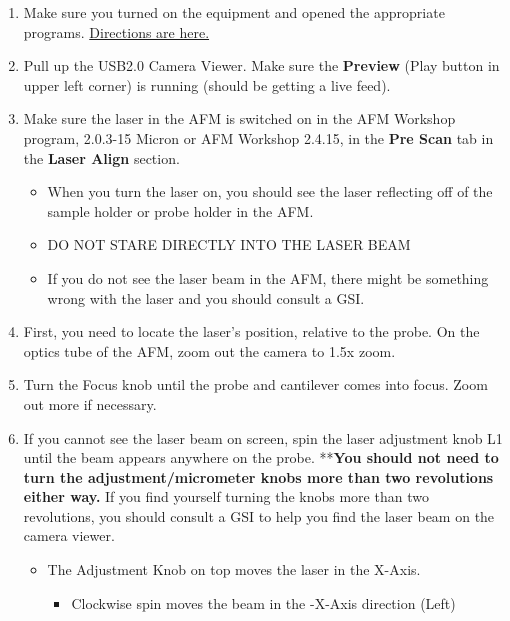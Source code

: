 \documentclass{../lab}
\begin{document}
\begin{enumerate}
    \item Make sure you turned on the equipment and opened the appropriate programs. \hyperref[subsec:TurnOnInstrumentsAndOpenPrograms]{Directions are here.}

    \item Pull up the USB2.0 Camera Viewer. Make sure the \textbf{Preview} (Play button in upper left corner) is running (should be getting a live feed).

    \item Make sure the laser in the AFM is switched on in the AFM Workshop program, 2.0.3-15 Micron or AFM Workshop 2.4.15, in the \textbf{Pre Scan} tab in the \textbf{Laser Align} section.
    \begin{itemize}
        \item When you turn the laser on, you should see the laser reflecting off of the sample holder or probe holder in the AFM.

        \item DO NOT STARE DIRECTLY INTO THE LASER BEAM

        \item If you do not see the laser beam in the AFM, there might be something wrong with the laser and you should consult a GSI.
    \end{itemize}

    \item First, you need to locate the laser's position, relative to the probe.  On the optics tube of the AFM, zoom out the camera to 1.5x zoom.

    \item Turn the Focus knob until the probe and cantilever comes into focus.  Zoom out more if necessary.

    \item If you cannot see the laser beam on screen, spin the laser adjustment knob L1 \textbf{ }until the beam appears anywhere on the probe.  **\textbf{You should not need to turn the adjustment/micrometer knobs more than two revolutions either way.  }If you find yourself turning the knobs more than two revolutions, you should consult a GSI to help you find the laser beam on the camera viewer.
    \begin{itemize}
        \item The Adjustment Knob on top moves the laser in the X-Axis.
        \begin{itemize}
            \item Clockwise spin moves the beam in the -X-Axis direction (Left)


\end{itemize}
\end{itemize}
\end{enumerate}
\end{document}
